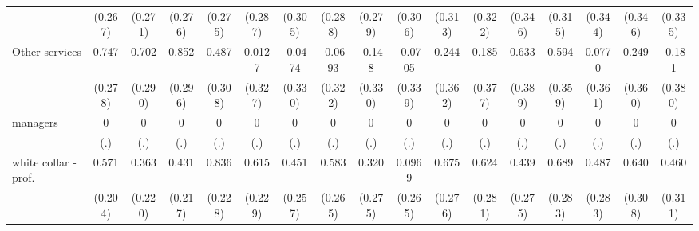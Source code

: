 {\begin{tabular}{l*{16}{c}}
                    &     (0.267)         &     (0.271)         &     (0.276)         &     (0.275)         &     (0.287)         &     (0.305)         &     (0.288)         &     (0.279)         &     (0.306)         &     (0.313)         &     (0.322)         &     (0.346)         &     (0.315)         &     (0.344)         &     (0.346)         &     (0.335)         \\
[1em]
Other services      &       0.747\sym{**} &       0.702\sym{*}  &       0.852\sym{**} &       0.487         &      0.0127         &     -0.0474         &     -0.0693         &      -0.148         &     -0.0705         &       0.244         &       0.185         &       0.633         &       0.594         &      0.0770         &       0.249         &      -0.181         \\
                    &     (0.278)         &     (0.290)         &     (0.296)         &     (0.308)         &     (0.327)         &     (0.330)         &     (0.322)         &     (0.330)         &     (0.339)         &     (0.362)         &     (0.377)         &     (0.389)         &     (0.359)         &     (0.361)         &     (0.360)         &     (0.380)         \\
[1em]
managers            &           0         &           0         &           0         &           0         &           0         &           0         &           0         &           0         &           0         &           0         &           0         &           0         &           0         &           0         &           0         &           0         \\
                    &         (.)         &         (.)         &         (.)         &         (.)         &         (.)         &         (.)         &         (.)         &         (.)         &         (.)         &         (.)         &         (.)         &         (.)         &         (.)         &         (.)         &         (.)         &         (.)         \\
[1em]
white collar - prof.&       0.571\sym{**} &       0.363         &       0.431\sym{*}  &       0.836\sym{***}&       0.615\sym{**} &       0.451         &       0.583\sym{*}  &       0.320         &      0.0969         &       0.675\sym{*}  &       0.624\sym{*}  &       0.439         &       0.689\sym{*}  &       0.487         &       0.640\sym{*}  &       0.460         \\
                    &     (0.204)         &     (0.220)         &     (0.217)         &     (0.228)         &     (0.229)         &     (0.257)         &     (0.265)         &     (0.275)         &     (0.265)         &     (0.276)         &     (0.281)         &     (0.275)         &     (0.283)         &     (0.283)         &     (0.308)         &     (0.311)         \\

\end{tabular}}
